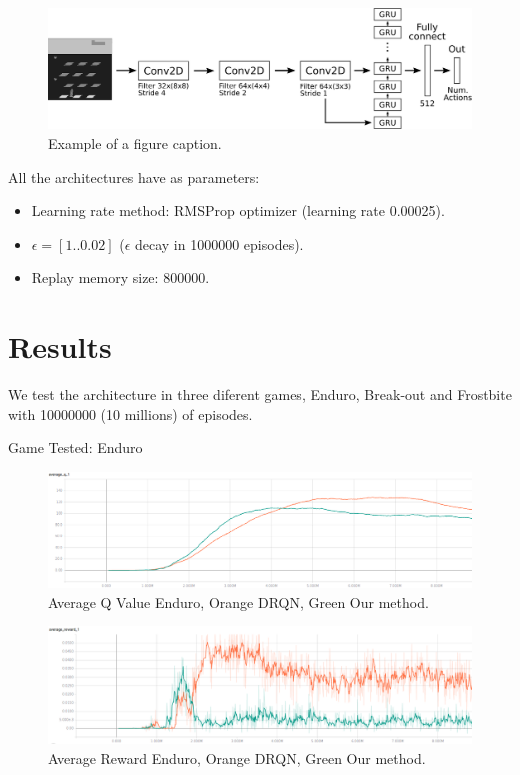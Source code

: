 \documentclass[conference]{IEEEtran}
\begin{document}
\begin{figure}[htbp]
\centerline{\includegraphics[width=\linewidth]{images/DGQN.png}}
\caption{Example of a figure caption.}
\label{dgrqn}
\end{figure}

All the architectures have as parameters:

\begin{itemize}
\item Learning rate method: RMSProp optimizer (learning rate 0.00025).
\item $\epsilon=[1 .. 0.02]$ ($\epsilon$ decay in 1000000 episodes).
\item Replay memory size: 800000.
\end{itemize}



\section{Results}

We test the architecture in three diferent games, Enduro, Break-out and Frostbite with 10000000 (10 millions) of episodes.

Game Tested:
Enduro
\begin{figure}[htbp]
\centerline{\includegraphics[width=\linewidth]{images/enduro-averQ-drqn-or-dgruqn-gr.png}}
\caption{Average Q Value Enduro, Orange DRQN, Green Our method.}
\label{enduro-q}
\end{figure}

\begin{figure}[htbp]
\centerline{\includegraphics[width=\linewidth]{images/enduro-av-rew-drqn-or-dgruqn-gr.png}}
\caption{Average Reward Enduro, Orange DRQN, Green Our method.}
\label{enduro-r}
\end{figure}
\end{document}
